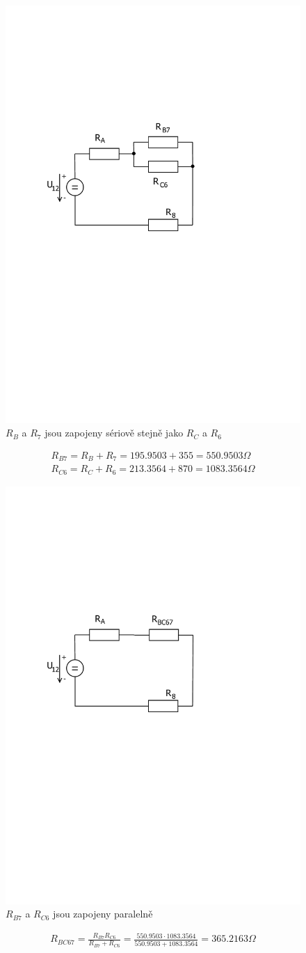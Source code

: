 	\begin{figure}[H]
		\center\includegraphics[width=0.6\linewidth]{obr/1_5}
		\caption{$R_B$ a $R_7$ jsou zapojeny sériově stejně jako $R_C$ a $R_6$}
	\end{figure}
	\begin{gather*}
		R_{B7} = R_B + R_7 = 195.9503 + 355 = 550.9503 \Omega \\
		R_{C6} = R_C + R_6 = 213.3564 + 870 = 1 083.3564 \Omega
	\end{gather*}


	\begin{figure}[H]
		\center\includegraphics[width=0.6\linewidth]{obr/1_6}
		\caption{ $R_{B7}$ a $R_{C6}$ jsou zapojeny paralelně}
	\end{figure}
	\begin{gather*}
		R_{BC67} = \frac{R_{B7} R_{C6}}{R_{B7} + R_{C6}} = \frac{550.9503 \cdot 1 083.3564}{550.9503 + 1 083.3564} = 365.2163 \Omega
	\end{gather*}

